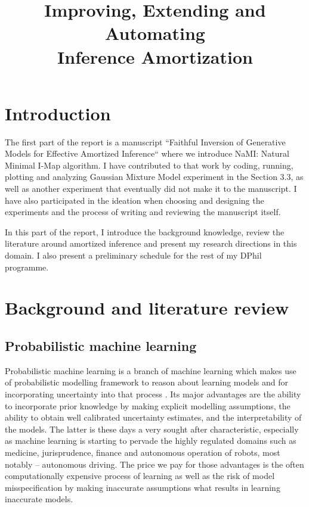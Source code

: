 \documentclass[12pt]{article}
\begin{document}




\title{Improving, Extending and Automating\\Inference Amortization}
\date{}
\maketitle

\vspace{-50pt}


\section{Introduction}
The first part of the report is a manuscript ``Faithful Inversion of Generative Models for Effective Amortized Inference`` where we introduce NaMI: Natural Minimal I-Map algorithm.
I have contributed to that work by coding, running, plotting and analyzing Gaussian Mixture Model experiment in the Section 3.3, as well as another experiment that eventually did not make it to the manuscript. 
I have also participated in the ideation when choosing and designing the experiments and the process of writing and reviewing the manuscript itself.

In this part of the report, I introduce the background knowledge, review the literature around amortized inference and 
present my research directions in this domain. 
I also present a preliminary schedule for the rest of my DPhil programme.




\section{Background and literature review}

\subsection{Probabilistic machine learning}
Probabilistic machine learning is a branch of machine learning which makes use of probabilistic modelling framework to reason about learning models and for incorporating uncertainty into that process \citep{Ghahramani2015}.
Its major advantages are the ability to incorporate prior knowledge by making explicit modelling assumptions, the ability to obtain well calibrated uncertainty estimates, and the interpretability of the models.
The latter is these days a very sought after characteristic, especially as machine learning is starting to pervade the highly regulated domains such as medicine, jurisprudence, finance and autonomous operation of robots, most notably -- autonomous driving.
The price we pay for those advantages is the often computationally expensive process of learning as well as the risk of model misspecification by making inaccurate assumptions what results in learning inaccurate models.
\end{document}
